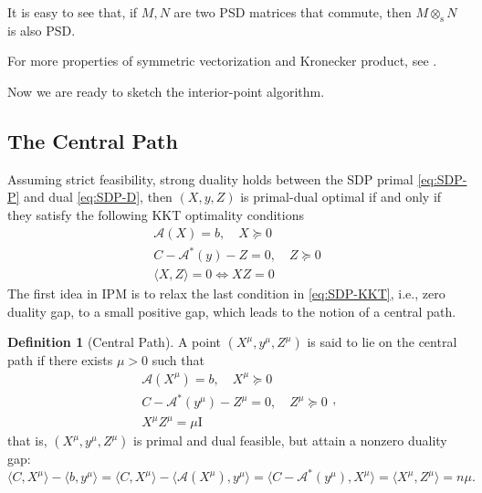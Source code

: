 \documentclass[
]{book}
\theoremstyle{definition}
\newtheorem{definition}{Definition}[chapter]
\theoremstyle{definition}
\theoremstyle{definition}
\theoremstyle{definition}
\theoremstyle{remark}
\begin{document}
It is easy to see that, if \(M,N\) are two PSD matrices that commute, then \(M \otimes_{\mathrm{s}}N\) is also PSD.

For more properties of symmetric vectorization and Kronecker product, see \citep{schacke04mthesis-kronecker}.

Now we are ready to sketch the interior-point algorithm.

\subsection{The Central Path}\label{the-central-path}

Assuming strict feasibility, strong duality holds between the SDP primal \eqref{eq:SDP-P} and dual \eqref{eq:SDP-D}, then \((X,y,Z)\) is primal-dual optimal if and only if they satisfy the following KKT optimality conditions
\begin{equation}
\begin{split}
\mathcal{A}(X) = b, \quad X \succeq 0 \\
C - \mathcal{A}^*(y) - Z = 0, \quad Z \succeq 0 \\
\langle X, Z \rangle = 0 \Leftrightarrow XZ = 0
\end{split}
\label{eq:SDP-KKT}
\end{equation}
The first idea in IPM is to relax the last condition in \eqref{eq:SDP-KKT}, i.e., zero duality gap, to a small positive gap, which leads to the notion of a central path.

\begin{definition}[Central Path]
\protect\hypertarget{def:CentralPath}{}\label{def:CentralPath}A point \((X^\mu,y^\mu,Z^\mu)\) is said to lie on the central path if there exists \(\mu > 0\) such that
\begin{equation}
\begin{split}
\mathcal{A}(X^\mu) = b, \quad X^\mu \succeq 0 \\
C - \mathcal{A}^*(y^\mu) - Z^\mu = 0, \quad Z^\mu \succeq 0 \\
X^\mu Z^\mu = \mu \mathrm{I}
\end{split},
\label{eq:SDP-central-path}
\end{equation}
that is, \((X^\mu,y^\mu,Z^\mu)\) is primal and dual feasible, but attain a nonzero duality gap:
\[
\langle C, X^\mu \rangle - \langle b, y^\mu \rangle = \langle C, X^\mu \rangle - \langle \mathcal{A}(X^\mu), y^\mu \rangle = \langle C - \mathcal{A}^*(y^\mu), X^\mu \rangle = \langle X^\mu, Z^\mu \rangle = n\mu.
\]
\end{definition}
\end{document}
